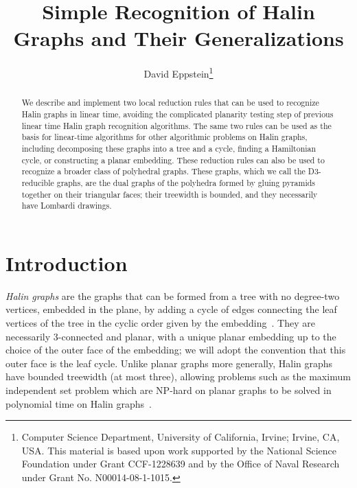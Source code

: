 \documentclass{article}
\title{Simple Recognition of Halin Graphs and Their Generalizations}
\author{David Eppstein\thanks{Computer Science Department, University of California, Irvine; Irvine, CA, USA. This material is based upon work supported by the National Science Foundation under Grant CCF-1228639 and by the Office of Naval Research under Grant No. N00014-08-1-1015.}}
\date{ }
\begin{document}
\maketitle

\begin{abstract}
We describe and implement two local reduction rules that can be used to recognize Halin graphs in linear time, avoiding the complicated planarity testing step of previous linear time Halin graph recognition algorithms. The same two rules can be used as the basis for linear-time algorithms for other algorithmic problems on Halin graphs, including decomposing these graphs into a tree and a cycle, finding a Hamiltonian cycle, or constructing a planar embedding.
These reduction rules can also be used to recognize a broader class of polyhedral graphs. These graphs, which we call the D3-reducible graphs, are the dual graphs of the polyhedra formed by gluing pyramids together on their triangular faces; their treewidth is bounded, and they necessarily have Lombardi drawings. 
\end{abstract}

\section{Introduction}

\emph{Halin graphs} are the graphs that can be formed from a tree with no degree-two vertices, embedded in the plane, by adding a cycle of edges connecting the leaf vertices of the tree in the cyclic order given by the embedding~\cite{Hal-CMA-71}. They are necessarily 3-connected  and planar, with a unique planar embedding up to the choice of the outer face of the embedding; we will adopt the convention that this outer face is the leaf cycle.
Unlike planar graphs more generally, Halin graphs have bounded treewidth (at most three), allowing problems such as the maximum independent set problem which are NP-hard on planar graphs to be solved in polynomial time on Halin graphs~\cite{Bod-ICALP-88}.
\end{document}

